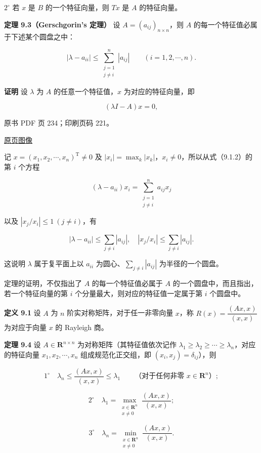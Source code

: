\(2^\circ\) 若 \(x\) 是 \(B\) 的一个特征向量，则 \(Tx\) 是 \(A\) 的特征向量。

\textbf{定理 9.3（Gerschgorin's 定理）} 设 \(A=(a_{ij})_{n\times n}\)，则 \(A\) 的每一个特征值必属于下述某个圆盘之中：

\[
|\lambda-a_{ii}|\leq\sum_{\substack{j=1\\j\ne i}}^n|a_{ij}|\qquad(i=1,2,\cdots,n).
\]

\textbf{证明} 设 \(\lambda\) 为 \(A\) 的任意一个特征值，\(x\) 为对应的特征向量，即

\[
(\lambda I-A)x=0,
\]

\clearpage

原书 PDF 页 234；印刷页码 221。

\href{source-images/pdf-234.jpeg}{原页图像}

记 \(x=(x_1,x_2,\cdots,x_n)^{\mathrm T}\ne0\) 及 \(|x_i|=\max_k|x_k|\)，\(x_i\ne0\)，所以从式（9.1.2）的第 \(i\) 个方程

\[
(\lambda-a_{ii})x_i=\sum_{\substack{j=1\\j\ne i}}^na_{ij}x_j
\]

以及 \(|x_j/x_i|\leq1\ (j\ne i)\)，有

\[
|\lambda-a_{ii}|\leq\sum_{j\ne i}|a_{ij}|,\quad |x_j/x_i|\leq\sum_{j\ne i}|a_{ij}|.
\]

这说明 \(\lambda\) 属于复平面上以 \(a_{ii}\) 为圆心、\(\sum_{j\ne i}|a_{ij}|\) 为半径的一个圆盘。

定理的证明，不仅指出了 \(A\) 的每一个特征值必属于 \(A\) 的一个圆盘中，而且指出，若一个特征向量的第 \(i\) 个分量最大，则对应的特征值一定属于第 \(i\) 个圆盘中。

\textbf{定义 9.1} 设 \(A\) 为 \(n\) 阶实对称矩阵，对于任一非零向量 \(x\)，称 \(R(x)=\dfrac{(Ax,x)}{(x,x)}\) 为对应于向量 \(x\) 的 Rayleigh 商。

\textbf{定理 9.4} 设 \(A\in\mathbf R^{n\times n}\) 为对称矩阵（其特征值依次记作 \(\lambda_1\geq\lambda_2\geq\cdots\geq\lambda_n\)，对应的特征向量 \(x_1,x_2,\cdots,x_n\) 组成规范化正交组，即 \((x_i,x_j)=\delta_{ij}\)），则

\[
1^\circ\quad \lambda_n\leq\frac{(Ax,x)}{(x,x)}\leq\lambda_1\qquad\text{（对于任何非零 }x\in\mathbf R^n\text{）};
\]

\[
2^\circ\quad \lambda_1=\max_{\substack{x\in\mathbf R^n\\x\ne0}}\frac{(Ax,x)}{(x,x)};
\]

\[
3^\circ\quad \lambda_n=\min_{\substack{x\in\mathbf R^n\\x\ne0}}\frac{(Ax,x)}{(x,x)}.
\]

